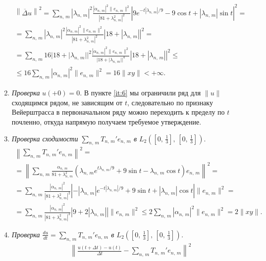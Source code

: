 \documentclass[a4paper]{article}
\begin{document}
\begin{sol}
\begin{enumerate}
\begin{multline*}
\left\lVert \overline{\Delta}u\right\rVert^2=\sum_{n,\,m}^{} |\lambda_{n,\,m}|^2 \frac{|\alpha_{n,\,m}|^2 \|e_{n,\,m}\|
^2}{|81+\lambda_{n,\,m}^2|^2}
	\left| 9 e^{-t |\lambda_{n,\,m}| /9}-9 \cos t+|\lambda_{n,\,m}| \sin t \right|^2=\\=
\sum_{n,\,m}^{} |\lambda_{n,\,m}|^2 \frac{|\alpha_{n,\,m}|^2 \|e_{n,\,m}\|
^2}{|81+\lambda_{n,\,m}^2|^2}
	\left|18+|\lambda_{n,\,m}| \right|^2=\\=
\sum_{n,\,m}^{}16 |18+|\lambda_{n,\,m}||^2 \frac{|\alpha_{n,\,m}|^2 \|e_{n,\,m}\|
^2}{|18+|\lambda_{n,\,m}||^4}
	\left|18+|\lambda_{n,\,m}| \right|^2\le \\ \le 
	16 \sum_{n,\,m}^{} |\alpha_{n,\,m}|^2\| e_{n,\,m}\|^2=
	16 \| xy\|<+\infty
.\end{multline*} 
\item \emph{Проверка} $u(+0)=0$. В пункте \ref{it:6} мы ограничили ряд для $\| u\|$ сходящимся рядом, не зависящим от $t$, следовательно
	по признаку Вейерштрасса в первоначальном ряду можно
	переходить к пределу по $t$ почленно, откуда напрямую
	получаем требуемое утверждение.
\item \emph{Проверка сходимости $\displaystyle \sum_{n,\,m} 
	T_{n,\,m}'e_{n,\,m}$ в $\displaystyle L_2 \left( 
	\left[ 0,\,\frac{1}{3} \right] ,\,\left[ 0,\,\frac{1}{3} \right] \right) $}.
\label{it:9}
\begin{multline*}
\left\lVert \sum_{n,\,m}^{} T_{n,\,m}'e_{n,\,m}\right\rVert^2
=\\= \left\lVert \sum_{n,\,m}^{} \frac{\alpha_{n,\,m}}{81+\lambda_{n,\,m}^2}
\left( \lambda_{n,\,m}e ^{t \lambda_{n,\,m} /9}+9 \sin t-
\lambda_{n,\,m}\cos t\right)e_{n,\,m} \right\rVert^2
=\\= \sum_{n,\,m}^{}  \frac{|\alpha_{n,\,m}|^2}{|81+\lambda_{n,\,m}^2|^2}
\left| -|\lambda_{n,\,m}|e ^{-t |\lambda_{n,\,m}| /9}+9 \sin t+
|\lambda_{n,\,m}|\cos t\right|\|e_{n,\,m} \|^2
=\\= \sum_{n,\,m}^{}  \frac{|\alpha_{n,\,m}|^2}{|81+\lambda_{n,\,m}^2|^2}
\left|9+
2|\lambda_{n,\,m}|\right|\|e_{n,\,m} \|^2
\le  2\sum_{n,\,m}^{}  |\alpha_{n,\,m}|^2
\|e_{n,\,m} \|^2=2 \| xy\|
.\end{multline*} 
\item \emph{Проверка $\displaystyle  \frac{du}{dt}= \sum_{n,\,m}^{} T_{n,\,m}'e_{n,\,m}$ в $\displaystyle L_2 \left( 
	\left[ 0,\,\frac{1}{3} \right] ,\,\left[ 0,\,\frac{1}{3} \right] \right) $.}
\begin{multline*}
	\left\lVert \frac{u(t+\Delta t)-u(t)}{\Delta t}-
	\sum_{n,\,m}^{} T_{n,\,m}' e_{n,\,m}\right\rVert^2

\end{multline*}
\end{enumerate}
\end{sol}
\end{document}
